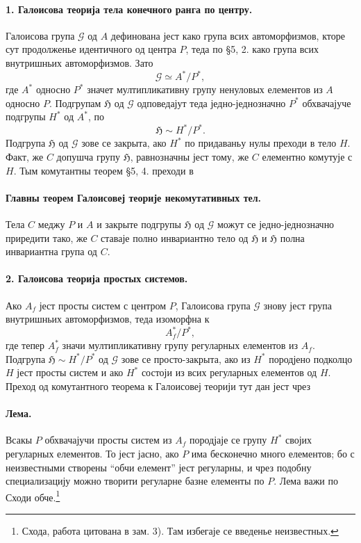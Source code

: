 ﻿\documentclass[11pt]{article}
\providecommand{\Gcal}{\mathcal G}
\providecommand{\glqq}{``}
\providecommand{\grqq}{''}
\begin{document}
\paragraph{1. Галоисова теорија тела конечного ранга по центру.}
Галоисова група \(\Gcal\) од \(A\) дефинована јест како група всих автоморфизмов, кторе сут продолженье идентичного од центра \(P\), теда по §5, 2. како група всих внутришньих автоморфизмов. Зато
\[
        \Gcal \simeq A^*/P^*,
\]
где \(A^*\) односно \(P^*\) значет мултипликативну групу ненуловых елементов из \(A\) односно \(P\). Подгрупам \(\mathfrak H\) од \(\Gcal\) одповедајут теда једно-једнозначно \(P^*\) обхвачајуче подгрупы \(H^*\) од \(A^*\), по
\[
        \mathfrak H \sim H^*/P^* .
\]
Подгрупа \(\mathfrak H\) од \(\Gcal\) зове се закрыта, ако \(H^*\) по придаваньу нулы преходи в тело \(H\). Факт, же \(C\) допушча групу \(\mathfrak H\), равнозначны јест тому, же \(C\) елементно комутује с \(H\). Тым комутантны теорем §5, 4. преходи в

\paragraph{Главны теорем Галоисовеј теорије некомутативных тел.}
Тела \(C\) меджу \(P\) и \(A\) и закрыте подгрупы \(\mathfrak H\) од \(\Gcal\) можут се једно-једнозначно приредити тако, же \(C\) ставаје полно инвариантно тело од \(\mathfrak H\) и \(\mathfrak H\) полна инвариантна група од \(C\).

\paragraph{2. Галоисова теорија простых системов.}
Ако \(A_f\) јест просты систем с центром \(P\), Галоисова група \(\Gcal\) знову јест група внутришньих автоморфизмов, теда изоморфна к
\[
        A_f^*/P^*,
\]
где тепер \(A_f^*\) значи мултипликативну групу регуларных елементов из \(A_f\). Подгрупа \(\mathfrak H\sim H^*/P^*\) од \(\Gcal\) зове се просто-закрыта, ако из \(H^*\) породјено подколцо \(H\) јест просты систем и ако \(H^*\) состоји из всих регуларных елементов од \(H\). Преход од комутантного теорема к Галоисовеј теорији тут дан јест чрез

\paragraph{Лема.}
Всакы \(P\) обхвачајучи просты систем из \(A_f\) породјаје се групу \(H^*\) својих регуларных елементов. То јест јасно, ако \(P\) има бесконечно много елементов; бо с неизвестными створены \glqq{}обчи елемент\grqq{} јест регуларны, и чрез подобну специализацију можно творити регуларне базне елементы по \(P\). Лема важи по Сходи обче.\footnote{Схода, работа цитована в зам. 3). Там избегаје се введенье неизвестных.}
\end{document}
